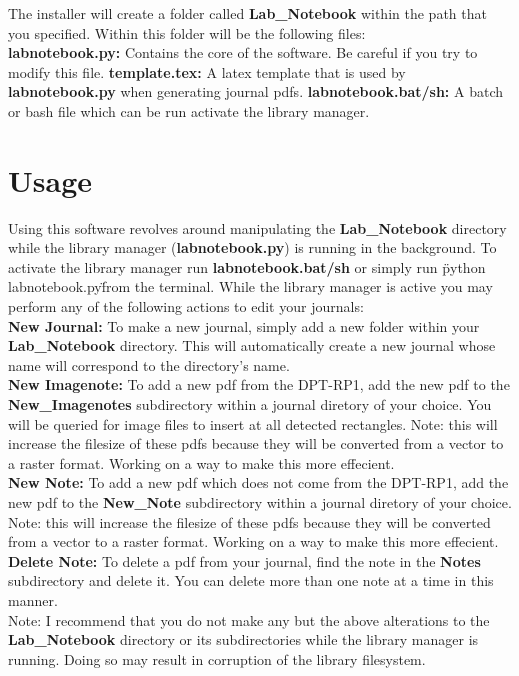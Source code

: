 \documentclass{article}
\begin{document}
The installer will create a folder called \textbf{Lab\_Notebook} within the path that you specified. Within this folder will be the following files:\\

\textbf{labnotebook.py:} Contains the core of the software. Be careful if you try to modify this file.
\textbf{template.tex:} A latex template that is used by \textbf{labnotebook.py} when generating journal pdfs.
\textbf{labnotebook.bat/sh:} A batch or bash file which can be run activate the library manager.

\section{Usage}

Using this software revolves around manipulating the \textbf{Lab\_Notebook} directory while the library manager (\textbf{labnotebook.py}) is running in the background. To activate the library manager run \textbf{labnotebook.bat/sh} or simply run \"python labnotebook.py\" from the terminal. While the library manager is active you may perform any of the following actions to edit your journals:\\

\textbf{New Journal:} To make a new journal, simply add a new folder within your \textbf{Lab\_Notebook} directory. This will automatically create a new journal whose name will correspond to the directory's name.\\

\textbf{New Imagenote:} To add a new pdf from the DPT-RP1, add the new pdf to the \textbf{New\_Imagenotes} subdirectory within a journal diretory of your choice. You will be queried for image files to insert at all detected rectangles. Note: this will increase the filesize of these pdfs because they will be converted from a vector to a raster format. Working on a way to make this more effecient.\\

\textbf{New Note:} To add a new pdf which does not come from the DPT-RP1, add the new pdf to the \textbf{New\_Note} subdirectory within a journal diretory of your choice. Note: this will increase the filesize of these pdfs because they will be converted from a vector to a raster format. Working on a way to make this more effecient.\\

\textbf{Delete Note:} To delete a pdf from your journal, find the note in the \textbf{Notes} subdirectory and delete it. You can delete more than one note at a time in this manner.\\

Note: I recommend that you do not make any but the above alterations to the \textbf{Lab\_Notebook} directory or its subdirectories while the library manager is running. Doing so may result in corruption of the library filesystem.
\end{document}
